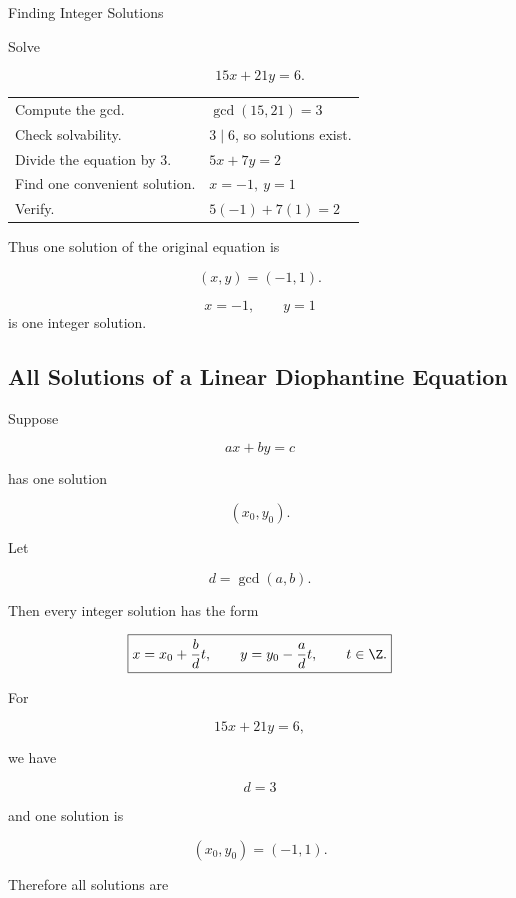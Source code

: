 \begin{workedexamplebox}{Finding Integer Solutions}

Solve

\[ 15x+21y=6. \]

\begin{tabularx}{\textwidth}{@{}>{\raggedright\arraybackslash}p{}X@{}}
Compute the gcd. &
\(\gcd(15,21)=3\)\\
Check solvability. &
\(3\mid6\), so solutions exist.\\
Divide the equation by \(3\). &
\(5x+7y=2\)\\
Find one convenient solution. &
\(x=-1,\ y=1\)\\
Verify. &
\(5(-1)+7(1)=2\)
\end{tabularx}

Thus one solution of the original equation is

\[ (x,y)=(-1,1). \]

\begin{answerbox}
\[ \boxed{x=-1,\qquad y=1} \]
is one integer solution.
\end{answerbox}
\end{workedexamplebox}

\subsection{All Solutions of a Linear Diophantine Equation}
\label{subsec:all-linear-diophantine-solutions}

Suppose

\[ ax+by=c \]

has one solution

\[ (x_0,y_0). \]

Let

\[ d=\gcd(a,b). \]

Then every integer solution has the form

\[ \boxed{x=x_0+\frac{b}{d}t,\qquad y=y_0-\frac{a}{d}t,\qquad t\in\Z.} \]

For

\[ 15x+21y=6, \]

we have

\[ d=3 \]

and one solution is

\[ (x_0,y_0)=(-1,1). \]

Therefore all solutions are

